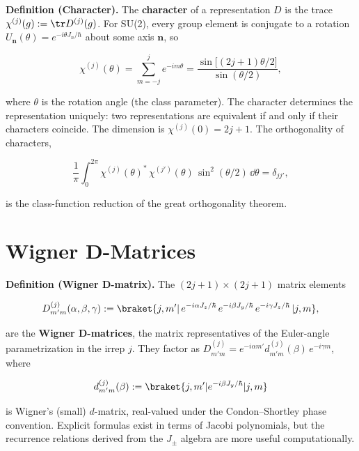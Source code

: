 \medskip\noindent\textbf{Definition (Character).} The \textbf{character} of a representation $D$ is the trace $\chi^{(j)}(g) := \tr D^{(j)}(g)$. For SU(2), every group element is conjugate to a rotation $U_{\bm n}(\theta) = e^{-i\theta J_n/\hbar}$ about some axis $\bm n$, so
\begin{linenomath}
    \begin{equation}
        \chi^{(j)}(\theta) = \sum_{m=-j}^j e^{-im\theta} = \frac{\sin\bigl[(2j+1)\theta/2\bigr]}{\sin(\theta/2)},
        \label{eq:su2-character}
    \end{equation}
\end{linenomath}
where $\theta$ is the rotation angle (the class parameter). The character determines the representation uniquely: two representations are equivalent if and only if their characters coincide. The dimension is $\chi^{(j)}(0) = 2j+1$. The orthogonality of characters,
\begin{linenomath}
    \begin{equation}
        \frac{1}{\pi}\int_0^{2\pi} \chi^{(j)}(\theta)^*\,\chi^{(j')}(\theta)\,\sin^2(\theta/2)\,\dd\theta = \delta_{jj'},
        \label{eq:character-orthogonality}
    \end{equation}
\end{linenomath}
is the class-function reduction of the great orthogonality theorem.

\section{Wigner D-Matrices}
\label{sec:appendix-d-matrices}

\medskip\noindent\textbf{Definition (Wigner D-matrix).} The $(2j+1) \times (2j+1)$ matrix elements
\begin{linenomath}
    \begin{equation}
        D^{(j)}_{m'm}(\alpha,\beta,\gamma) := \braket{j,m'|\,e^{-i\alpha J_z/\hbar}\,e^{-i\beta J_y/\hbar}\,e^{-i\gamma J_z/\hbar}\,|j,m},
        \label{eq:D-matrix-def-app}
    \end{equation}
\end{linenomath}
are the \textbf{Wigner D-matrices}, the matrix representatives of the Euler-angle parametrization in the irrep $j$. They factor as $D^{(j)}_{m'm} = e^{-i\alpha m'} d^{(j)}_{m'm}(\beta)\,e^{-i\gamma m}$, where
\begin{linenomath}
    \begin{equation}
        d^{(j)}_{m'm}(\beta) := \braket{j,m'|e^{-i\beta J_y/\hbar}|j,m}
        \label{eq:small-d}
    \end{equation}
\end{linenomath}
is Wigner's (small) $d$-matrix, real-valued under the Condon--Shortley phase convention. Explicit formulas exist in terms of Jacobi polynomials, but the recurrence relations derived from the $J_\pm$ algebra are more useful computationally.

